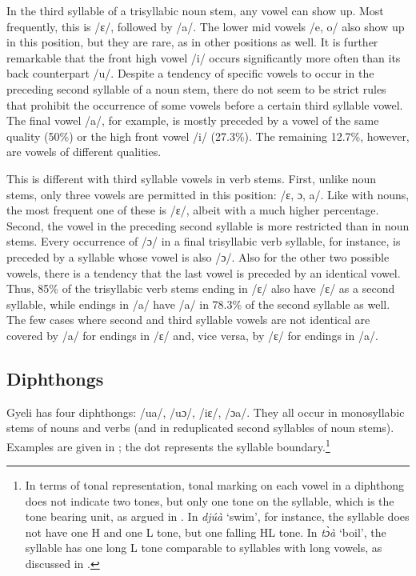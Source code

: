 In the third syllable of a trisyllabic noun stem, any vowel can show up. Most frequently, this is /ɛ/, followed by /a/. The lower mid vowels /e, o/ also show up in this position, but they are rare, as in other positions as well.  It is further remarkable that the front high vowel /i/ occurs significantly more often than its back counterpart /u/. Despite a tendency of specific vowels to occur in the preceding second syllable of a noun stem, there do not seem to be strict rules that prohibit the occurrence of some vowels before a certain third syllable vowel. The final vowel /a/, for example, is mostly preceded by a vowel of the same quality (50\%) or the high front vowel /i/ (27.3\%). The remaining 12.7\%, however, are vowels of different qualities.

This is different with third syllable vowels in verb stems. First, unlike noun stems, only three vowels are permitted in this position: /ɛ, ɔ, a/. Like with nouns, the most frequent one of these is /ɛ/, albeit with a much higher percentage. Second, the vowel in the preceding second syllable is more restricted than in noun stems. Every occurrence of /ɔ/ in a final trisyllabic verb syllable, for instance, is preceded by a syllable whose vowel is also /ɔ/. Also for the other two possible vowels, there is a tendency that the last vowel is preceded by an identical vowel. Thus, 85\% of the trisyllabic verb stems ending in /ɛ/ also have /ɛ/ as a second syllable, while endings in /a/ have /a/ in 78.3\% of the second syllable as well. The few cases where second and third syllable vowels are not identical are covered by /a/ for endings in /ɛ/ and, vice versa, by /ɛ/ for endings in /a/.





\subsection{Diphthongs}
\label{sec:Diph}

Gyeli has four diphthongs: /ua/, /uɔ/, /iɛ/, /ɔa/. They all occur in monosyllabic stems of nouns and verbs (and in reduplicated second syllables of noun stems). Examples are given in ; the dot represents the syllable boundary.\footnote{In terms of tonal representation, tonal marking on each vowel in a diphthong does not indicate two tones, but only one tone on the syllable, which is the tone bearing unit, as argued in . In {\itshape djúà} `swim', for instance, the syllable does not have one H and one L tone, but one falling HL tone. In {\itshape tɔ̀à} `boil', the syllable has one long L tone comparable to syllables with long vowels, as discussed in .}

